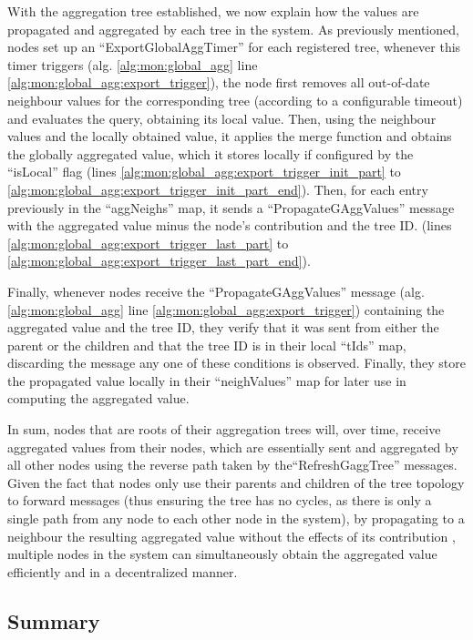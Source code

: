 With the aggregation tree established, we now explain how the values are propagated and aggregated by each tree in the system. As previously mentioned, nodes set up an ``ExportGlobalAggTimer'' for each registered tree, whenever this timer triggers (alg.  \ref{alg:mon:global_agg} line \ref{alg:mon:global_agg:export_trigger}), the node first removes all out-of-date neighbour values for the corresponding tree (according to a configurable timeout) and evaluates the query, obtaining its local value. Then, using the neighbour values and the locally obtained value, it applies the merge function and obtains the globally aggregated value, which it stores locally if configured by the ``isLocal'' flag (lines \ref{alg:mon:global_agg:export_trigger_init_part} to \ref{alg:mon:global_agg:export_trigger_init_part_end}). Then, for each entry previously in the ``aggNeighs'' map, it sends a ``PropagateGAggValues'' message with the aggregated value minus the node's contribution and the tree ID. (lines \ref{alg:mon:global_agg:export_trigger_last_part} to \ref{alg:mon:global_agg:export_trigger_last_part_end}). 

Finally, whenever nodes receive the ``PropagateGAggValues'' message (alg. \ref{alg:mon:global_agg} line \ref{alg:mon:global_agg:export_trigger}) containing the aggregated value and the tree ID, they verify that it was sent from either the parent or the children and that the tree ID is in their local ``tIds'' map, discarding the message any one of these conditions is observed. Finally, they store the propagated value locally in their ``neighValues'' map for later use in computing the aggregated value.

In sum, nodes that are roots of their aggregation trees will, over time, receive aggregated values from their nodes, which are essentially sent and aggregated by all other nodes using the reverse path taken by the``RefreshGaggTree'' messages. Given the fact that nodes only use their parents and children of the tree topology to forward messages (thus ensuring the tree has no cycles, as there is only a single path from any node to each other node in the system), by propagating to a neighbour the resulting aggregated value without the effects of its contribution \cite{akosThesis}, multiple nodes in the system can simultaneously obtain the aggregated value efficiently and in a decentralized manner.

\subsection{Summary}


